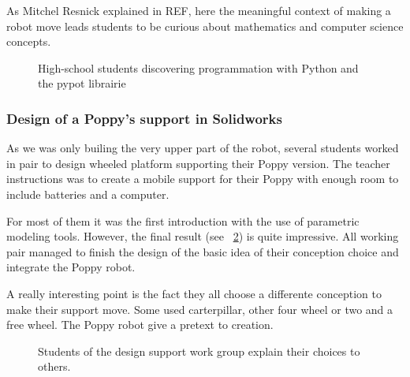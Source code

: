 As Mitchel Resnick explained in REF, here the meaningful context of making a robot move leads students to be curious about mathematics and computer science concepts.


\begin{figure}[]
\centering
    \hfil
    \hfil
    \hfil
    \caption{High-school students discovering programmation with Python and the pypot librairie}
    \label{fig:saintonge_software}
\end{figure}

\subsubsection{Design of a Poppy's support in Solidworks} %

As we was only builing the very upper part of the robot, several students worked in pair to design wheeled platform supporting their Poppy version. The teacher instructions was to create a mobile support for their Poppy with enough room to include batteries and a computer.

For most of them it was the first introduction with the use of parametric modeling tools. However, the final result (see \figurename~\ref{fig:saintonge_support}) is quite impressive. All working pair managed to finish the design of the basic idea of their conception choice and integrate the Poppy robot.

A really interesting point is the fact they all choose a differente conception to make their support move. Some used carterpillar, other four wheel or two and a free wheel. The Poppy robot give a pretext to creation.

\begin{figure}[]
\centering
    \hfil
    \hfil
    \caption{Students of the design support work group explain their choices to others.}
    \label{fig:saintonge_support}
\end{figure}



